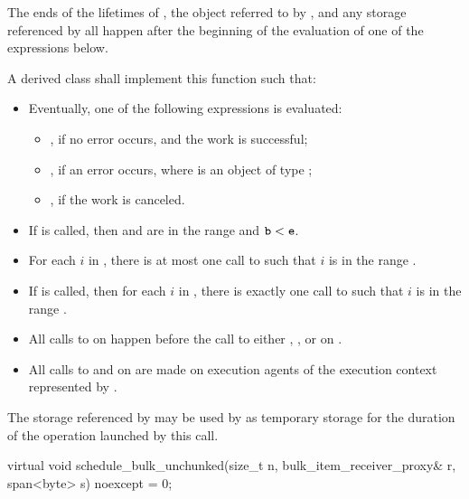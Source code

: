 \begin{itemdescr}
\pnum
\expects
The ends of
the lifetimes of ,
the object referred to by , and
any storage referenced by 
all happen after
the beginning of the evaluation of one of the expressions below.

\pnum
\effects
A derived class shall implement this function such that:
\begin{itemize}
\item
Eventually, one of the following expressions is evaluated:
\begin{itemize}
\item
{}, if no error occurs, and the work is successful;
\item
{}, if an error occurs,
where  is an object of type ;
\item
{}, if the work is canceled.
\end{itemize}
\item
If  is called,
then  and  are in the range  and
$\texttt{\protect b} < \texttt{\protect e}$.
\item
For each $i$ in ,
there is at most one call to 
such that $i$ is in the range .
\item
If  is called,
then for each $i$ in ,
there is exactly one call to 
such that $i$ is in the range .
\item
All calls to  on  happen before
the call to either , , or 
on .
\item
All calls to  and  on  are made
on execution agents of the execution context represented by .
\end{itemize}

\pnum
\remarks
The storage referenced by  may be used by 
as temporary storage for the duration of the operation launched by this call.
\end{itemdescr}

%
\begin{itemdecl}
virtual void schedule_bulk_unchunked(size_t n, bulk_item_receiver_proxy& r,
                                     span<byte> s) noexcept = 0;
\end{itemdecl}

